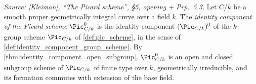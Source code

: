 \begin{definition}

  \label{def:pic_zero_subscheme}

  \textit{Source: [Kleiman], ``The Picard scheme'', \S 5, opening +
  Prp.~5.3.}
  Let \(C/k\) be a smooth proper geometrically integral curve over a field
  \(k\). The \emph{identity component of the Picard scheme}
  \(\Pic^0_{C/k}\) is the identity component
  \((\Pic_{C/k})^0\) of the \(k\)-group scheme \(\Pic_{C/k}\) of
  \cref{def:pic_scheme}, in the sense of
  \cref{def:identity_component_group_scheme}. By
  \cref{thm:identity_component_open_subgroup}, \(\Pic^0_{C/k}\) is an open
  and closed subgroup scheme of \(\Pic_{C/k}\) of finite type over \(k\),
  geometrically irreducible, and its formation commutes with
  extension of the base field.
\end{definition}

